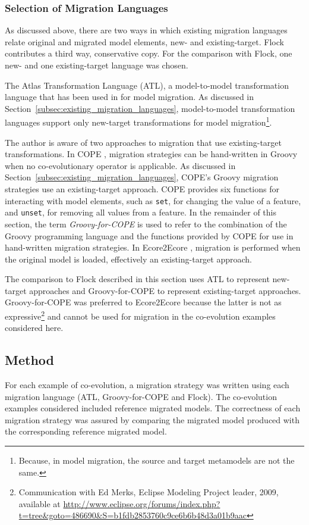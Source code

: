 \subsubsection{Selection of Migration Languages}
As discussed above, there are two ways in which existing migration languages relate original and migrated model elements, new- and existing-target. Flock contributes a third way, conservative copy. For the comparison with Flock, one new- and one existing-target language was chosen.

The Atlas Transformation Language (ATL), a model-to-model transformation language that has been used in \cite{cicchetti08automating,garces09managing} for model migration. As discussed in Section~\ref{subsec:existing_migration_languages}, model-to-model transformation languages support only new-target transformations for model migration\footnote{Because, in model migration, the source and target metamodels are not the same.}.

The author is aware of two approaches to migration that use existing-target transformations. In COPE \cite{herrmannsdoerfer09cope}, migration strategies can be hand-written in Groovy when no co-evolutionary operator is applicable. As discussed in Section~\ref{subsec:existing_migration_languages}, COPE's Groovy migration strategies use an existing-target approach. COPE provides six functions for interacting with model elements, such as \texttt{set}, for changing the value of a feature, and \texttt{unset}, for removing all values from a feature. In the remainder of this section, the term \emph{Groovy-for-COPE} is used to refer to the combination of the Groovy programming language and the functions provided by COPE for use in hand-written migration strategies. In Ecore2Ecore \cite{hussey06advanced}, migration is performed when the original model is loaded, effectively an existing-target approach.

The comparison to Flock described in this section uses ATL to represent new-target approaches and Groovy-for-COPE to represent existing-target approaches. Groovy-for-COPE was preferred to Ecore2Ecore because the latter is not as expressive\footnote{Communication with Ed Merks, Eclipse Modeling Project leader, 2009, available at \url{http://www.eclipse.org/forums/index.php?t=tree&goto=486690&S=b1fdb2853760c9ce6b6b48d3a01b9aac}} and cannot be used for migration in the co-evolution examples considered here.

\subsection{Method}
\label{subsubsec:quantitive_method}
For each example of co-evolution, a migration strategy was written using each migration language (ATL, Groovy-for-COPE and Flock). The co-evolution examples considered included reference migrated models. The correctness of each migration strategy was assured by comparing the migrated model produced with the corresponding reference migrated model.

